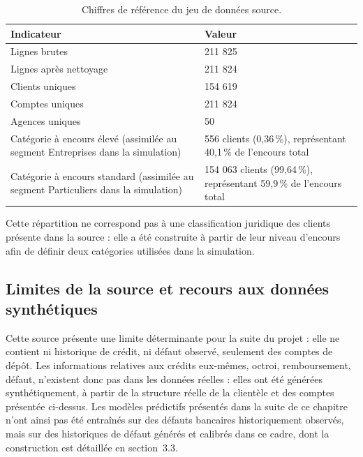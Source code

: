 \begin{table}[htbp]
    \centering
    \footnotesize
    \caption{Chiffres de référence du jeu de données source.}
    \label{tab:donnees-source}
    \begin{tabular}{p{7cm}p{4cm}}
        \toprule
        \textbf{Indicateur} & \textbf{Valeur} \\
        \midrule
        Lignes brutes & 211 825 \\
        Lignes après nettoyage & 211 824 \\
        Clients uniques & 154 619 \\
        Comptes uniques & 211 824 \\
        Agences uniques & 50 \\
        Catégorie à encours élevé (assimilée au segment Entreprises dans la simulation) & 556 clients (0,36\,\%), représentant 40,1\,\% de l'encours total \\
        Catégorie à encours standard (assimilée au segment Particuliers dans la simulation) & 154 063 clients (99,64\,\%), représentant 59,9\,\% de l'encours total \\
        \bottomrule
    \end{tabular}
\end{table}

Cette répartition ne correspond pas à une classification juridique des clients présente dans la source : elle a été construite à partir de leur niveau d'encours afin de définir deux catégories utilisées dans la simulation.

\subsection{Limites de la source et recours aux données synthétiques}

Cette source présente une limite déterminante pour la suite du projet : elle ne contient ni historique de crédit, ni défaut observé, seulement des comptes de dépôt. Les informations relatives aux crédits eux-mêmes, octroi, remboursement, défaut, n'existent donc pas dans les données réelles : elles ont été générées synthétiquement, à partir de la structure réelle de la clientèle et des comptes présentée ci-dessus. Les modèles prédictifs présentés dans la suite de ce chapitre n'ont ainsi pas été entraînés sur des défauts bancaires historiquement observés, mais sur des historiques de défaut générés et calibrés dans ce cadre, dont la construction est détaillée en section~3.3.

